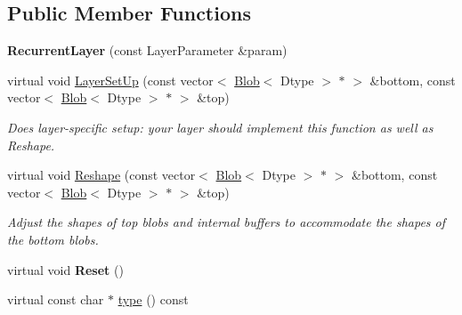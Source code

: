 \subsection*{Public Member Functions}
\begin{DoxyCompactItemize}
\item 
{\bfseries Recurrent\+Layer} (const Layer\+Parameter \&param)\hypertarget{classcaffe_1_1RecurrentLayer_a3f02919dbb32c07c89bfda4ea68c09df}{}\label{classcaffe_1_1RecurrentLayer_a3f02919dbb32c07c89bfda4ea68c09df}

\item 
virtual void \hyperlink{classcaffe_1_1RecurrentLayer_aafa788d0a3535c80478fee74b9dbb62b}{Layer\+Set\+Up} (const vector$<$ \hyperlink{classcaffe_1_1Blob}{Blob}$<$ Dtype $>$ $\ast$ $>$ \&bottom, const vector$<$ \hyperlink{classcaffe_1_1Blob}{Blob}$<$ Dtype $>$ $\ast$ $>$ \&top)
\begin{DoxyCompactList}\small\item\em Does layer-\/specific setup\+: your layer should implement this function as well as Reshape. \end{DoxyCompactList}\item 
virtual void \hyperlink{classcaffe_1_1RecurrentLayer_a07a6d838be5330334335256811d2b6f6}{Reshape} (const vector$<$ \hyperlink{classcaffe_1_1Blob}{Blob}$<$ Dtype $>$ $\ast$ $>$ \&bottom, const vector$<$ \hyperlink{classcaffe_1_1Blob}{Blob}$<$ Dtype $>$ $\ast$ $>$ \&top)
\begin{DoxyCompactList}\small\item\em Adjust the shapes of top blobs and internal buffers to accommodate the shapes of the bottom blobs. \end{DoxyCompactList}\item 
virtual void {\bfseries Reset} ()\hypertarget{classcaffe_1_1RecurrentLayer_a9f0bf24a571da40f490b9b78a51d9393}{}\label{classcaffe_1_1RecurrentLayer_a9f0bf24a571da40f490b9b78a51d9393}

\item 
virtual const char $\ast$ \hyperlink{classcaffe_1_1RecurrentLayer_ab3bc55d48b2acc9d6cf3ec03008ef513}{type} () const \hypertarget{classcaffe_1_1RecurrentLayer_ab3bc55d48b2acc9d6cf3ec03008ef513}{}\label{classcaffe_1_1RecurrentLayer_ab3bc55d48b2acc9d6cf3ec03008ef513}


\end{DoxyCompactItemize}
